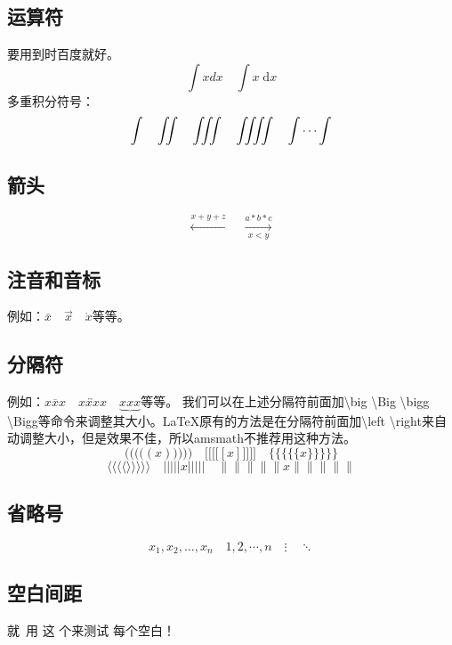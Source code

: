 \documentclass[UTF8]{article}
\begin{document}
\subsection{运算符}
要用到时百度就好。
\newcommand{\myd}{\;\mathrm{d}}
\[\int x dx \quad \int x \myd x \]
多重积分符号：\[\int \quad \iint \quad \iiint \quad \iiiint \quad \idotsint \]

\subsection{箭头}
\[\xleftarrow{x+y+z}\quad \xrightarrow[x<y]{a*b*c}\]

\subsection{注音和音标}
例如：$\bar{x} \quad \vec{x} \quad \mathring{x}$等等。

\subsection{分隔符}
例如：$\overline{xxx} \quad \overleftrightarrow{xxxx}\quad \underbrace{xxx}$等等。
我们可以在上述分隔符前面加\textbackslash big \textbackslash Big \textbackslash bigg \textbackslash Bigg等命令来调整其大小。\LaTeX 原有的方法是在分隔符前面加\textbackslash left \textbackslash right来自动调整大小，但是效果不佳，所以amsmath不推荐用这种方法。
\[ \Bigg(\bigg(\Big(\big((x)\big)\Big)\bigg)\Bigg)\quad\Bigg[\bigg[\Big[\big[[x]\big]\Big]\bigg]\Bigg]\quad\Bigg\{\bigg\{\Big\{\big\{\{x\}\big\}\Big\}\bigg\}\Bigg\}\]\[\Bigg\langle\bigg\langle\Big\langle\big\langle \rangle\big\rangle\Big\rangle\bigg\rangle\Bigg\rangle\quad\Bigg\lvert\bigg\lvert\Big\lvert\big\lvert\lvert x\rvert\big\rvert\Big\rvert\bigg\rvert\Bigg\rvert\quad\Bigg\lVert\bigg\lVert\Big\lVert\big\lVert\lVert x\rVert\big\rVert\Big\rVert\bigg\rVert\Bigg\rVert \]

\subsection{省略号}
\[x_1,x_2,\dots,x_n\quad 1,2,\cdots,n\quad \vdots\quad\ddots\]

\subsection{空白间距}
就\, 用\: 这\; 个\quad 来\qquad 测试\! 每个空白！
\end{document}
